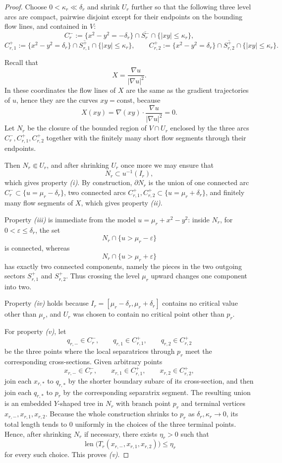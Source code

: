 \documentclass[12pt]{amsart}
\theoremstyle{definition}
\theoremstyle{remark}
\begin{document}
\begin{proof}
Choose $0<\kappa_r\ll \delta_r$ and shrink $U_r$ further so that the following three level arcs are
compact, pairwise disjoint except for their endpoints on the bounding flow lines, and contained in $V$:
\[
C_r^-:=\{x^2-y^2=-\delta_r\}\cap \overline{S_r^-}\cap\{|xy|\le \kappa_r\},
\]
\[
C_{r,1}^+:=\{x^2-y^2=\delta_r\}\cap \overline{S_{r,1}^+}\cap\{|xy|\le \kappa_r\},
\qquad
C_{r,2}^+:=\{x^2-y^2=\delta_r\}\cap \overline{S_{r,2}^+}\cap\{|xy|\le \kappa_r\}.
\]

Recall that
\[
X=\frac{\nabla u}{|\nabla u|^2}.
\]
In these coordinates the flow lines of $X$ are the same as the gradient trajectories of $u$, hence
they are the curves $xy=\mathrm{const}$, because
\[
X(xy)=\nabla(xy)\cdot \frac{\nabla u}{|\nabla u|^2}=0.
\]
Let $N_r$ be the closure of the bounded region of $V\cap U_r$ enclosed by the three arcs
$C_r^-, C_{r,1}^+, C_{r,2}^+$ together with the finitely many short flow segments through their endpoints.

Then $N_r\Subset U_r$, and after shrinking $U_r$ once more we may ensure that
\[
N_r\subset u^{-1}(I_r),
\]
which gives property \emph{(i)}. By construction, $\partial N_r$ is the union of one connected arc
$C_r^-\subset\{u=\mu_r-\delta_r\}$, two connected arcs
$C_{r,1}^+, C_{r,2}^+\subset\{u=\mu_r+\delta_r\}$, and finitely many flow segments of $X$,
which gives property \emph{(ii)}.

Property \emph{(iii)} is immediate from the model $u=\mu_r+x^2-y^2$: inside $N_r$, for
$0<\varepsilon\le \delta_r$, the set
\[
N_r\cap\{u>\mu_r-\varepsilon\}
\]
is connected, whereas
\[
N_r\cap\{u>\mu_r+\varepsilon\}
\]
has exactly two connected components, namely the pieces in the two outgoing sectors
$S_{r,1}^+$ and $S_{r,2}^+$. Thus crossing the level $\mu_r$ upward changes one component into two.

Property \emph{(iv)} holds because $I_r=[\mu_r-\delta_r,\mu_r+\delta_r]$ contains no critical value
other than $\mu_r$, and $U_r$ was chosen to contain no critical point other than $p_r$.

For property \emph{(v)}, let
\[
q_{r,-}\in C_r^-,
\qquad
q_{r,1}\in C_{r,1}^+,
\qquad
q_{r,2}\in C_{r,2}^+
\]
be the three points where the local separatrices through $p_r$ meet the corresponding cross-sections.
Given arbitrary points
\[
x_{r,-}\in C_r^-,
\qquad
x_{r,1}\in C_{r,1}^+,
\qquad
x_{r,2}\in C_{r,2}^+,
\]
join each $x_{r,*}$ to $q_{r,*}$ by the shorter boundary subarc of its cross-section, and then join
each $q_{r,*}$ to $p_r$ by the corresponding separatrix segment. The resulting union is an embedded
$Y$-shaped tree in $N_r$ with branch point $p_r$ and terminal vertices
$x_{r,-},x_{r,1},x_{r,2}$. Because the whole construction shrinks to $p_r$ as
$\delta_r,\kappa_r\to 0$, its total length tends to $0$ uniformly in the choices of the three terminal
points. Hence, after shrinking $N_r$ if necessary, there exists $\eta_r>0$ such that
\[
\operatorname{len}\bigl(T_r(x_{r,-},x_{r,1},x_{r,2})\bigr)\le \eta_r
\]
for every such choice. This proves \emph{(v)}.


\end{proof}
\end{document}
